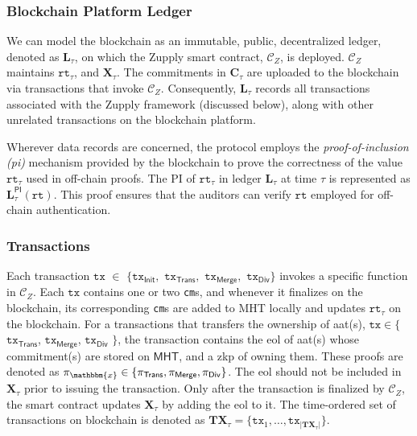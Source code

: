 \subsubsection{Blockchain Platform Ledger}
We can model the blockchain as an immutable, public, decentralized ledger, denoted as $\mathbf{L}_\tau$, on which the Zupply smart contract, $\mathcal{C}_Z$, is deployed.  $\mathcal{C}_Z$ maintains $\texttt{rt}_\tau$, and $\mathbf{X}_\tau$. The commitments in $\mathbf{C}_\tau$ are uploaded to the blockchain via transactions that invoke $\mathcal{C}_Z$. Consequently, $\mathbf{L}_\tau$ records all transactions associated with the Zupply framework (discussed below), along with other unrelated transactions on the blockchain platform.

Wherever data records are concerned, the protocol employs the \textit{proof-of-inclusion (\gls{pi})} mechanism provided by the blockchain to prove the correctness of the value $\texttt{rt}_\tau$ used in off-chain proofs. The PI of $\texttt{rt}_\tau$ in ledger $\mathbf{L}_\tau$ at time $\tau$ is represented as $\mathbf{L}_\tau^\mathsf{PI}(\texttt{rt})$. This proof ensures that the auditors can  verify  $\texttt{rt}$ employed for off-chain authentication.  

\subsubsection{Transactions}
Each transaction  $\texttt{tx}$ $\in$ $\{ \texttt{tx}_\textsf{Init},$ $\texttt{tx}_\textsf{Trans},$ $\texttt{tx}_\textsf{Merge},$ $\texttt{tx}_\textsf{Div} \}$ invokes a specific function in $\mathcal{C}_Z$. Each $\texttt{tx}$ contains one or two \texttt{cm}s, and whenever it finalizes on the blockchain,  its corresponding \texttt{cm}s are added to \textsf{MHT} locally and updates $\texttt{rt}_\tau$  on the blockchain. For a transactions that transfers the ownership of \gls{aat}(s), $\texttt{tx} \in \{$$\texttt{tx}_\textsf{Trans}$, $\texttt{tx}_\textsf{Merge}$, $\texttt{tx}_\textsf{Div}$ $\}$, the transaction contains the \gls{eol} of \gls{aat}(s) whose commitment(s) are stored on $\mathsf{MHT}$, and a \gls{zkp} of owning them. These proofs are denoted as $\pi_\mathbbm{x} \in \{\pi_\textsf{Trans}, \pi_\textsf{Merge}, \pi_\textsf{Div} \}$. The \gls{eol} should not be included in $\mathbf{X}_\tau$ prior to issuing the transaction. Only after the transaction is finalized by $\mathcal{C}_Z$, the smart contract updates $\mathbf{X}_\tau$ by adding the \gls{eol} to it.
The time-ordered set of transactions on blockchain is denoted as $\mathbf{TX}_\tau = \{\texttt{tx}_1, \dots, \texttt{tx}_{|\mathbf{TX}_\tau|}\}$.


